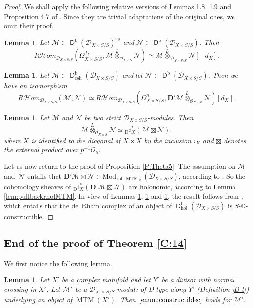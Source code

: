 \documentclass[english]{smfart}
\numberwithin{subsection}{section}
\def\sha{\mathcal{A}}\let\cA\sha
\def\shd{\mathcal{D}}\let\cD\shd
\def\shm{\mathcal{M}}
\def\shn{\mathcal{N}}\let\shn\shn
\def\sho{\mathcal{O}}\let\cO\sho
\newcommand{\C}{\mathbb{C}}\let\CC\C
\newcommand{\bD}{\boldsymbol{D}}
\newcommand{\Rhom}{R\shhom}
\newcommand{\shhom}{\mathcal{H}\!\mathit{om}}\let\ho\shhom
\newcommand{\rb}{\mathrm{b}}
\newcommand{\coh}{\mathrm{coh}}
\newcommand{\hol}{\mathrm{hol}}
\newcommand{\Mod}{\mathrm{Mod}}
\newcommand{\op}{\mathrm{op}}
\newcommand{\XS}{X\times S}
\newcommand{\XpS}{X'\times S}
\newcommand{\DXS}{\shd_{\XS/S}}
\newcommand{\DXpS}{\shd_{\XpS/S}}
\DeclareMathOperator{\rD}{\mathsf{D}}
\DeclareMathOperator{\MTM}{MTM}
\newcommand{\Di}{{}_{\scriptscriptstyle\mathrm{D}}i}
\newcommand{\pOS}{p^{-1}\sho_S}
\numberwithin{equation}{section}
\theoremstyle{plain}
\newtheorem{lemma}[equation]{Lemma}
\theoremstyle{definition}
\begin{document}
\begin{proof}
We shall apply the following relative versions of Lemmas 1.8, 1.9 and Proposition 4.7 of \cite{Kashiwara78}. Since they are trivial adaptations of the original ones, we omit their proof.

\begin{lemma}\label{L:K1}
Let $\shm\in\rD^\rb(\DXS)^{\op}$ and $\shn\in\rD^\rb(\DXS)$. Then $$\Rhom_{\DXS}(\Omega^{d_X}_{\XS/S},\shm\overset{L}{\otimes}_{\sho_{\XS}}\shn)\simeq
\shm\overset{L}{\otimes}_{\DXS}\shn[-d_X].$$
\end{lemma}

\begin{lemma}\label{L:K2}
Let $\shm\in\rD^\rb_{\coh}(\DXS)$ and let $\shn\in\rD^\rb(\DXS)$. Then we have an isomorphism
$$\Rhom_{\DXS}(\shm,\shn)\simeq\Rhom_{\DXS}(\Omega_{\XS/S}^n, \bD'\shm\overset{L}\otimes_{\sho_{\XS}}\shn)[d_X].$$
\end{lemma}

\begin{lemma}\label{L:K3}
Let $\shm$ and $\shn$ be two strict $\DXS$-modules. Then
$$\shm\overset{L}{\otimes}_{\sho_{\XS}}\shn\simeq \Di^*_X(\shm\boxtimes \shn),$$
where $X$ is identified to the diagonal of $X\times X$ by the inclusion $i_X$ and $\boxtimes$ denotes the external product over $\pOS$.
\end{lemma}

Let us now return to the proof of Proposition \ref{P:Theta5}. The assumption on $\shm$ and~$\shn$ entails that $\bD'\shm\boxtimes\shn\in\Mod_{\hol,\MTM_\sha}(\DXS)$, according to \cite[Th.\,13.3.1\,\& Prop.\,11.4.6]{Mochizuki11}. So the cohomology sheaves of \hbox{$\Di^*_X(\bD'\shm\boxtimes \shn)$} are holonomic, according to Lemma \ref{lem:pullbackrholMTM}. In view of Lemmas \ref{L:K1}, \ref{L:K2} and \ref{L:K3}, the result follows from \cite[Th\,3.7]{MF-S12}, which entails that the de~Rham complex of an object of $\rD^\rb_\hol(\DXS)$ is $S$-$\C$-constructible.
\end{proof}

\subsection{End of the proof of Theorem \ref{C:14}}
We first notice the following lemma.

\begin{lemma}\label{lem:cDtype}
Let $X'$ be a complex manifold and let $Y'$ be a divisor with normal crossing in $X'$. Let $\shm'$ be a $\DXpS$-module of D-type along $Y'$ (Definition \ref{D-t}) underlying an object of $\MTM(X')$. Then~$\eqref{enum:constructiblec}$ holds for $\shm'$.
\end{lemma}
\end{document}

